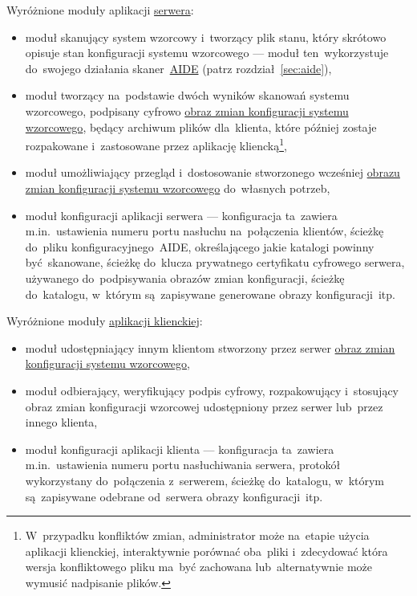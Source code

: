 \documentclass[thesis]{subfiles}
\begin{document}
Wyróżnione moduły aplikacji \hyperref[sec:srv-app]{serwera}:\mynobreakpar
\begin{itemize}
	\item moduł skanujący system wzorcowy i~tworzący plik stanu, który skrótowo opisuje stan konfiguracji systemu wzorcowego --- moduł ten~wykorzystuje do~swojego działania skaner~\hyperref[sec:aide]{AIDE} (patrz rozdział~\ref{sec:aide}),
	\item moduł tworzący na~podstawie dwóch wyników skanowań systemu wzorcowego, podpisany cyfrowo \hyperref[sec:obraz-zmian-konfiguracji]{obraz zmian konfiguracji systemu wzorcowego}, będący archiwum plików dla~klienta, które później zostaje rozpakowane i~zastosowane przez aplikację kliencką\footnote{W~przypadku konfliktów zmian, administrator może na~etapie użycia aplikacji klienckiej, interaktywnie porównać oba~pliki i~zdecydować która wersja konfliktowego pliku ma~być zachowana lub~alternatywnie może wymusić nadpisanie plików.},
	\item moduł umożliwiający przegląd i~dostosowanie stworzonego wcześniej \hyperref[sec:obraz-zmian-konfiguracji]{obrazu zmian konfiguracji systemu wzorcowego} do~własnych potrzeb,
	\item moduł konfiguracji aplikacji serwera --- konfiguracja ta~zawiera m.in.~ustawienia numeru portu nasłuchu na~połączenia klientów, ścieżkę do~pliku konfiguracyjnego~AIDE, określającego jakie katalogi powinny być~skanowane, ścieżkę do~klucza prywatnego certyfikatu cyfrowego serwera, używanego do~podpisywania obrazów zmian konfiguracji, ścieżkę do~katalogu, w~którym są~zapisywane generowane obrazy konfiguracji~itp.
\end{itemize}

Wyróżnione moduły \hyperref[sec:cli-app]{aplikacji klienckiej}:\mynobreakpar
\begin{itemize}
	\item moduł udostępniający innym klientom stworzony przez serwer \hyperref[sec:obraz-zmian-konfiguracji]{obraz zmian konfiguracji systemu wzorcowego},
	\item moduł odbierający, weryfikujący podpis cyfrowy, rozpakowujący i~stosujący obraz zmian konfiguracji wzorcowej udostępniony przez serwer lub~przez innego klienta,
	\item moduł konfiguracji aplikacji klienta --- konfiguracja ta~zawiera m.in.~ustawienia numeru portu nasłuchiwania serwera, protokół wykorzystany do~połączenia z~serwerem, ścieżkę do~katalogu, w~którym są~zapisywane odebrane od~serwera obrazy konfiguracji~itp.
\end{itemize}
\end{document}
